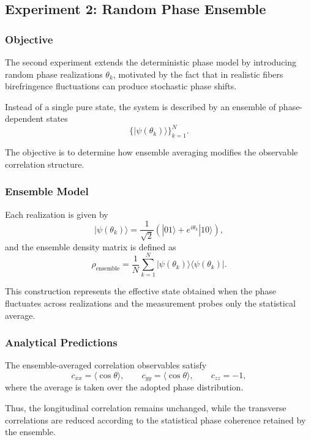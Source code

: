 \documentclass[a4paper]{article}
\begin{document}

\subsection{Experiment 2: Random Phase Ensemble}

\subsubsection{Objective}

The second experiment extends the deterministic phase model by introducing random phase realizations \(\theta_k\), motivated by the fact that in realistic fibers birefringence fluctuations can produce stochastic phase shifts.

Instead of a single pure state, the system is described by an ensemble of phase-dependent states
\[
\{ |\psi(\theta_k)\rangle \}_{k=1}^{N}.
\]

The objective is to determine how ensemble averaging modifies the observable correlation structure.

\subsubsection{Ensemble Model}

Each realization is given by
\[
|\psi(\theta_k)\rangle
=
\frac{1}{\sqrt{2}}
\left(
|01\rangle + e^{i\theta_k}|10\rangle
\right),
\]
and the ensemble density matrix is defined as
\[
\rho_{\mathrm{ensemble}}
=
\frac{1}{N}
\sum_{k=1}^{N}
|\psi(\theta_k)\rangle\langle \psi(\theta_k)|.
\]

This construction represents the effective state obtained when the phase fluctuates across realizations and the measurement probes only the statistical average.

\subsubsection{Analytical Predictions}

The ensemble-averaged correlation observables satisfy
\[
c_{xx} = \langle \cos\theta \rangle,\qquad
c_{yy} = \langle \cos\theta \rangle,\qquad
c_{zz} = -1,
\]
where the average is taken over the adopted phase distribution.

Thus, the longitudinal correlation remains unchanged, while the transverse correlations are reduced according to the statistical phase coherence retained by the ensemble.
\end{document}
